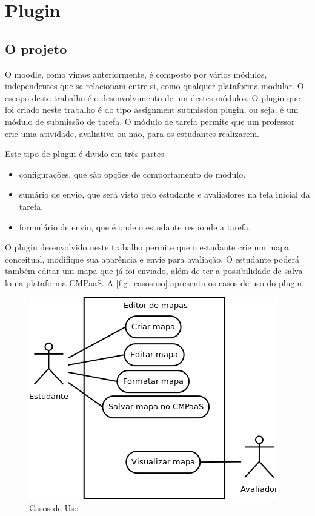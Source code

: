 \documentclass[
	12pt,				%
	openright,			%
	oneside,			%
	a4paper,			%
	english,			%
	french,				%
	spanish,			%
	brazil				%
	]{abntex2}
\begin{document}
 

\chapter{Plugin}
\section{O projeto}

O moodle, como vimos anteriormente, é composto por vários módulos, independentes que se relacionam entre si, como qualquer plataforma modular. O escopo deste trabalho é o desenvolvimento de um destes módulos. O plugin que foi criado neste trabalho é do tipo assignment submission plugin, ou seja, é um módulo de submissão de tarefa. O módulo de tarefa permite que um professor crie uma atividade, avaliativa ou não, para os estudantes realizarem.

Este tipo de plugin é divido em três partes:
\begin{itemize}
	\item configurações, que são opções de comportamento do módulo.
	\item sumário de envio, que será visto pelo estudante e avaliadores na tela inicial da tarefa.
	\item formulário de envio, que é onde o estudante responde a tarefa.  
\end{itemize} 

O plugin desenvolvido neste trabalho permite que o estudante crie um mapa conceitual, modifique sua aparência e envie para avaliação. O estudante poderá também editar um mapa que já foi enviado, além de ter a possibilidade de salva-lo na plataforma CMPaaS. A \autoref{fig_casosuso} apresenta os casos de uso do plugin.

\begin{figure}[htb]
	\caption{\label{fig_casosuso} Casos de Uso}
	\begin{center}
		\includegraphics[scale=0.7]{casosuso.png}
	\end{center}
\end{figure} 
\end{document}
